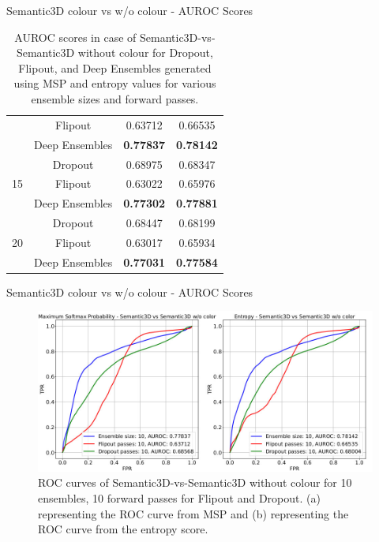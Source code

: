 \documentclass[aspectratio=169]{beamer}
\begin{document}
\begin{frame}{Semantic3D colour vs w/o colour - AUROC Scores}
\begin{table}[h!]
{\begin{tabular}{cccc}
                                & Flipout              & 0.63712          & 0.66535          \\
                                & Deep Ensembles       & \textbf{0.77837} & \textbf{0.78142} \\ \hline
        \multirow{3}{*}{15}     & Dropout              & 0.68975          & 0.68347          \\
                                & Flipout              & 0.63022           & 0.65976          \\
                                & Deep Ensembles       & \textbf{0.77302} & \textbf{0.77881} \\ \hline
        \multirow{3}{*}{20}     & Dropout              & 0.68447          & 0.68199          \\
                                & Flipout              & 0.63017          & 0.65934          \\
                                & Deep Ensembles       & \textbf{0.77031} & \textbf{0.77584} \\ \hline
        \end{tabular}
        }
        \caption{AUROC scores in case of Semantic3D-vs-Semantic3D without colour for Dropout, Flipout, and  Deep Ensembles generated using MSP and entropy values for various ensemble sizes and forward passes.}
        \label{tab:auroc_ood_2}
    \end{table}
\end{frame}
\begin{frame}{Semantic3D colour vs w/o colour - AUROC Scores}
    \begin{figure}
        \centering
        \includegraphics[scale=0.35]{images/ood2_roc_curves.jpg}
        \caption{ROC curves of Semantic3D-vs-Semantic3D without colour for 10 ensembles, 10 forward
        passes for Flipout and Dropout. (a) representing the ROC curve from MSP and (b) representing the ROC
        curve from the entropy score.}
    \end{figure}
\end{frame}
\end{document}
